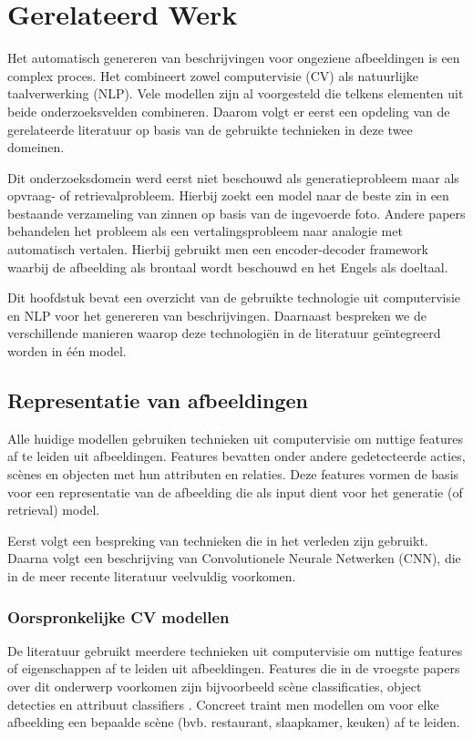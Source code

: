 \chapter{Gerelateerd Werk}
\label{hoofdstuk:related}
Het automatisch genereren van beschrijvingen voor ongeziene afbeeldingen is een complex proces. Het combineert zowel computervisie (CV) als natuurlijke taalverwerking (NLP). Vele modellen zijn al voorgesteld die telkens elementen uit beide onderzoeksvelden combineren. Daarom volgt er eerst een opdeling van de gerelateerde literatuur op basis van de gebruikte technieken in deze twee domeinen. 

Dit onderzoeksdomein werd eerst niet beschouwd als generatieprobleem maar als opvraag- of retrievalprobleem. Hierbij zoekt een model naar de beste zin in een bestaande verzameling van zinnen op basis van de ingevoerde foto.\cite{Hodosh2013} Andere papers behandelen het probleem als een vertalingsprobleem naar analogie met automatisch vertalen. Hierbij gebruikt men een encoder-decoder framework waarbij de afbeelding als brontaal wordt beschouwd en het Engels als doeltaal.

Dit hoofdstuk bevat een overzicht van de gebruikte technologie uit computervisie en NLP voor het genereren van beschrijvingen. Daarnaast bespreken we de verschillende manieren waarop deze technologi\"en in de literatuur ge\"integreerd worden in \'e\'en model.

\section{Representatie van afbeeldingen}
Alle huidige modellen gebruiken technieken uit computervisie om nuttige features af te leiden uit afbeeldingen. Features bevatten onder andere gedetecteerde acties, sc\`enes en objecten met hun attributen en relaties.\cite{Bernardi} Deze features vormen de basis voor een representatie van de afbeelding die als input dient voor het generatie (of retrieval) model. 

Eerst volgt een bespreking van technieken die in het verleden zijn gebruikt. Daarna volgt een beschrijving van Convolutionele Neurale Netwerken (CNN), die in de meer recente literatuur veelvuldig voorkomen.


\subsection{Oorspronkelijke CV modellen}
De literatuur gebruikt meerdere technieken uit computervisie om nuttige features of eigenschappen af te leiden uit afbeeldingen. Features die in de vroegste papers over dit onderwerp voorkomen zijn bijvoorbeeld sc\`ene classificaties, object detecties en attribuut classifiers \cite{Farhadi2010,Yang2011,Patterson2014}. Concreet traint men modellen om voor elke afbeelding een bepaalde sc\`ene (bvb. restaurant, slaapkamer, keuken) af te leiden. 

